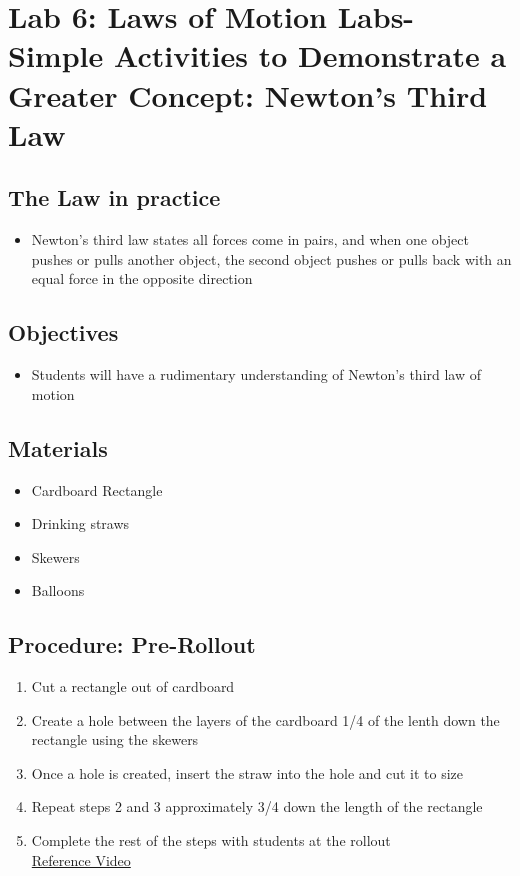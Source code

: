 \documentclass{article}
\begin{document}
\section*{Lab 6: Laws of Motion Labs- Simple Activities to Demonstrate a Greater Concept: Newton's Third Law} 
    \subsection{The Law in practice}
        \begin{itemize} 
            \item Newton's third law states all forces come in pairs, and when one object pushes or pulls another object, the second object pushes or pulls back with an equal force in the opposite direction
        \end{itemize}
    \subsection{Objectives}
        \begin{itemize}
            \item Students will have a rudimentary understanding of Newton's third law of motion
        \end{itemize}
    \subsection{Materials}
        \begin{itemize}
            \item Cardboard Rectangle
            \item Drinking straws
            \item Skewers
            \item Balloons
        \end{itemize}
    \subsection{Procedure: Pre-Rollout}
        \begin{enumerate}
            \item Cut a rectangle out of cardboard
            \item Create a hole between the layers of the cardboard 1/4 of the lenth down the rectangle using the skewers
            \item Once a hole is created, insert the straw into the hole and cut it to size
            \item Repeat steps 2 and 3 approximately 3/4 down the length of the rectangle
            \item Complete the rest of the steps with students at the rollout\\
            \href{https://youtu.be/-OENIttg1dU}{Reference Video}
        \end{enumerate}
       
\end{document}
